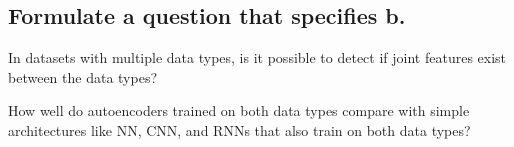 \subsection{Formulate a question that specifies b.}

In datasets with multiple data types, is it possible to detect if joint features exist between the data types?

How well do autoencoders trained on both data types compare with simple architectures like NN, CNN, and RNNs that also train on both data types?


